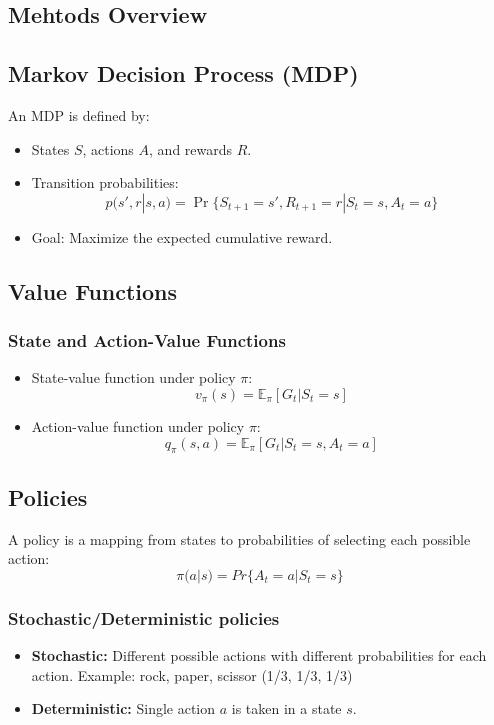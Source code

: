 \subsection{Mehtods Overview}

\subsection{Markov Decision Process (MDP)}
An MDP is defined by:
\begin{itemize}
    \item States $S$, actions $A$, and rewards $R$.
    \item Transition probabilities:
    \[
    p(s', r | s, a) = \Pr\{S_{t+1}=s', R_{t+1}=r | S_t=s, A_t=a\}
    \]
    \item Goal: Maximize the expected cumulative reward.
\end{itemize}

\subsection{Value Functions}
\subsubsection{State and Action-Value Functions}
\begin{itemize}
    \item State-value function under policy $\pi$:
    \[
    v_\pi(s) = \mathbb{E}_\pi[G_t | S_t = s]
    \]
    \item Action-value function under policy $\pi$:
    \[
    q_\pi(s, a) = \mathbb{E}_\pi[G_t | S_t = s, A_t = a]
    \]
\end{itemize}
\subsection{Policies}
A policy is a mapping from states to probabilities of selecting each possible action:
\[
\pi(a|s) = Pr\{A_t = a|S_t = s\}
\]
\subsubsection{Stochastic/Deterministic policies}
\begin{itemize}
    \item \textbf{Stochastic:} Different possible actions with different probabilities for each action. Example: rock, paper, scissor (1/3, 1/3, 1/3)
    \item \textbf{Deterministic:} Single action \(a\) is taken in a state \(s\).
\end{itemize}

